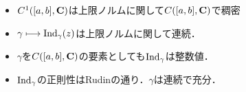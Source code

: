 	\begin{itemize}
		\item $C^1([a,b],\mathbf{C})$は上限ノルムに関して$C([a,b],\mathbf{C})$で稠密
		\item $\gamma \longmapsto \operatorname{Ind}_{\gamma}(z)$は上限ノルムに関して連続．
		\item $\gamma$を$C([a,b],\mathbf{C})$の要素としても$\operatorname{Ind}_{\gamma}$は整数値．
		\item $\operatorname{Ind}_{\gamma}$の正則性はRudinの通り．$\gamma$は連続で充分．
	\end{itemize}